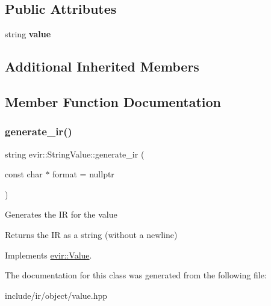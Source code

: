 \subsection*{Public Attributes}
\begin{DoxyCompactItemize}
\item 
\mbox{\label{classevir_1_1StringValue_a67f645bf8d1e71c7b8239c65a795d17f}} 
string {\bfseries value}
\end{DoxyCompactItemize}
\subsection*{Additional Inherited Members}


\subsection{Member Function Documentation}
\mbox{\label{classevir_1_1StringValue_ae635609dfe7acf237b71bdb48625712e}} 
\subsubsection{\texorpdfstring{generate\+\_\+ir()}{generate\_ir()}}
{\footnotesize\ttfamily string evir\+::\+String\+Value\+::generate\+\_\+ir (\begin{DoxyParamCaption}\item[{const char $\ast$}]{format = {\ttfamily nullptr} }\end{DoxyParamCaption})\hspace{0.3cm}{\ttfamily [virtual]}}

Generates the IR for the value \begin{DoxyReturn}{Returns}
the IR as a string (without a newline) 
\end{DoxyReturn}


Implements \hyperlink{classevir_1_1Value_a3e7e5bc634fd5bba528324076fe2a763}{evir\+::\+Value}.



The documentation for this class was generated from the following file\+:\begin{DoxyCompactItemize}
\item 
include/ir/object/value.\+hpp\end{DoxyCompactItemize}

